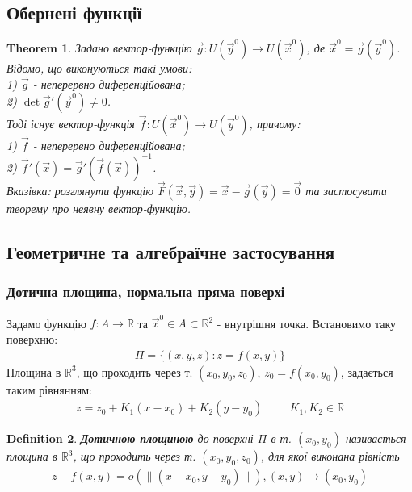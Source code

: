 \documentclass[a4paper, 10pt]{article}
\theoremstyle{theoremdd}
\newtheorem{theorem}{Theorem}[subsection]
\theoremstyle{theoremdd}
\newtheorem{definition}[theorem]{Definition}
\theoremstyle{theoremdd}
\theoremstyle{theoremdd}
\theoremstyle{theoremdd}
\theoremstyle{theoremdd}
\theoremstyle{theoremdd}
\theoremstyle{theoremdd}
\newcommand\Norm[1]{\lVert#1\rVert}
\begin{document}
\subsection{Обернені функції}
\begin{theorem}
Задано вектор-функцію $\vec{g}: U(\vec{y}^0) \to U(\vec{x}^0)$, де $\vec{x}^0 = \vec{g}(\vec{y}^0)$. Відомо, що виконуються такі умови:\\
1) $\vec{g}$ - неперервно диференційована; \\
2) $\det \vec{g}'(\vec{y}^0) \neq 0$.\\
Тоді існує вектор-функція $\vec{f}: U(\vec{x}^0) \to U(\vec{y}^0)$, причому:\\
1) $\vec{f}$ - неперервно диференційована; \\
2) $\vec{f}'(\vec{x}) = \vec{g}'(\vec{f}(\vec{x}))^{-1}$.\\
\textit{Вказівка: розглянути функцію $\vec{F}(\vec{x},\vec{y}) = \vec{x} - \vec{g}(\vec{y}) = \vec{0}$ та застосувати теорему про неявну вектор-функцію.}
\end{theorem}

\subsection{Геометричне та алгебраїчне застосування}
\subsubsection{Дотична площина, нормальна пряма поверхі}
Задамо функцію $f: A \to \mathbb{R}$ та $\vec{x}^0 \in A \subset \mathbb{R}^2$ - внутрішня точка. Встановимо таку поверхню:
\begin{align*}
\Pi = \{(x,y,z): z = f(x,y) \}
\end{align*}
Площина в $\mathbb{R}^{3}$, що проходить через т. $(x_0, y_0, z_0)$, $z_0 = f(x_0,y_0)$, задається таким рівнянням:
\begin{align*}
z = z_0 + K_1(x-x_0) + K_2(y-y_0) \hspace{1cm} K_1,K_2 \in \mathbb{R}
\end{align*}

\begin{definition}
\textbf{Дотичною площиною} до поверхні $\Pi$ в т. $(x_0,y_0)$ називається площина в $\mathbb{R}^{3}$, що проходить через т. $(x_0,y_0,z_0)$, для якої виконана рівність
\begin{align*}
z - f(x,y) = o(\Norm{(x-x_0,y-y_0)}), (x,y) \to (x_0,y_0)
\end{align*}
\end{definition}
\end{document}
